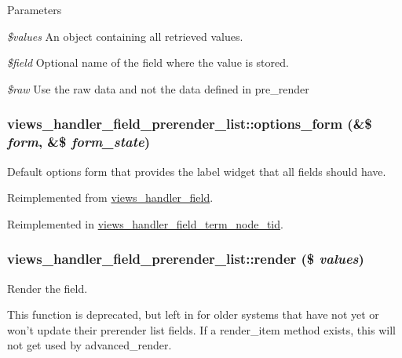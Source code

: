\begin{DoxyParams}{Parameters}
\item[{\em \$values}]An object containing all retrieved values. \item[{\em \$field}]Optional name of the field where the value is stored. \item[{\em \$raw}]Use the raw data and not the data defined in pre\_\-render \end{DoxyParams}
\hypertarget{classviews__handler__field__prerender__list_a6a88df29dbdd11aefc5d108dca6530e0}{
\subsubsection[{options\_\-form}]{\setlength{\rightskip}{0pt plus 5cm}views\_\-handler\_\-field\_\-prerender\_\-list::options\_\-form (\&\$ {\em form}, \/  \&\$ {\em form\_\-state})}}
\label{classviews__handler__field__prerender__list_a6a88df29dbdd11aefc5d108dca6530e0}
Default options form that provides the label widget that all fields should have. 

Reimplemented from \hyperlink{classviews__handler__field_a0435d161922b7b4b84f02a2e79bb947a}{views\_\-handler\_\-field}.

Reimplemented in \hyperlink{classviews__handler__field__term__node__tid_a0f0641c036e0a2498abd497cba1161a5}{views\_\-handler\_\-field\_\-term\_\-node\_\-tid}.\hypertarget{classviews__handler__field__prerender__list_ae29a9fc47e5a83e9a8eb314dc46e68cf}{
\subsubsection[{render}]{\setlength{\rightskip}{0pt plus 5cm}views\_\-handler\_\-field\_\-prerender\_\-list::render (\$ {\em values})}}
\label{classviews__handler__field__prerender__list_ae29a9fc47e5a83e9a8eb314dc46e68cf}
Render the field.

This function is deprecated, but left in for older systems that have not yet or won't update their prerender list fields. If a render\_\-item method exists, this will not get used by advanced\_\-render. 

